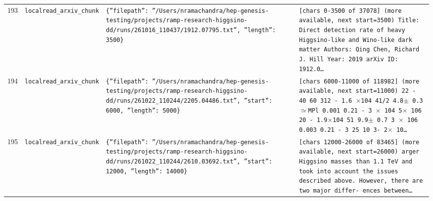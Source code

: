 \documentclass[11pt,a4paper]{article}
\begin{document}
\begin{longtable}{@{}p{}p{}p{}p{}@{}}
193 & \texttt{local}\newline\texttt{read\_\allowbreak{}arxiv\_\allowbreak{}chunk} & \texttt{\{''filepath'':\allowbreak{} ''/\allowbreak{}Users/\allowbreak{}nramachandra/\allowbreak{}hep-genesis-testing/\allowbreak{}projects/\allowbreak{}ramp-research-higgsino-dd/\allowbreak{}runs/\allowbreak{}261016\_\allowbreak{}110437/\allowbreak{}1912.07795.txt'',\allowbreak{} ''length'':\allowbreak{} 3500\}\allowbreak{}} & \texttt{[chars 0-3500 of 37078]\allowbreak{} (more available,\allowbreak{} next start=\allowbreak{}3500)\allowbreak{}  Title:\allowbreak{} Direct detection rate of heavy Higgsino-like and Wino-like dark matter Authors:\allowbreak{} Qing Chen,\allowbreak{} Richard J. Hill Year:\allowbreak{} 2019 arXiv ID:\allowbreak{} 1912.0\ldots{}\allowbreak{}} \\
194 & \texttt{local}\newline\texttt{read\_\allowbreak{}arxiv\_\allowbreak{}chunk} & \texttt{\{''filepath'':\allowbreak{} ''/\allowbreak{}Users/\allowbreak{}nramachandra/\allowbreak{}hep-genesis-testing/\allowbreak{}projects/\allowbreak{}ramp-research-higgsino-dd/\allowbreak{}runs/\allowbreak{}261022\_\allowbreak{}110244/\allowbreak{}2205.04486.txt'',\allowbreak{} ''start'':\allowbreak{} 6000,\allowbreak{} ''length'':\allowbreak{} 5000\}\allowbreak{}} & \texttt{[chars 6000-11000 of 118982]\allowbreak{} (more available,\allowbreak{} next start=\allowbreak{}11000)\allowbreak{}  22 - 40 60 312 - 1.6 $\times$104 41/\allowbreak{}2 4.8$\pm$ 0.3 $\simeq$MPl 0.001 0.21 - 3 $\times$ 104 5$\times$ 106 20 - 1.9$\times$104 51 9.9$\pm$ 0.7 3 $\times$ 106 0.003 0.21 - 3 25 10 3- 2$\times$ 10\ldots{}\allowbreak{}} \\
195 & \texttt{local}\newline\texttt{read\_\allowbreak{}arxiv\_\allowbreak{}chunk} & \texttt{\{''filepath'':\allowbreak{} ''/\allowbreak{}Users/\allowbreak{}nramachandra/\allowbreak{}hep-genesis-testing/\allowbreak{}projects/\allowbreak{}ramp-research-higgsino-dd/\allowbreak{}runs/\allowbreak{}261022\_\allowbreak{}110244/\allowbreak{}2610.03692.txt'',\allowbreak{} ''start'':\allowbreak{} 12000,\allowbreak{} ''length'':\allowbreak{} 14000\}\allowbreak{}} & \texttt{[chars 12000-26000 of 83465]\allowbreak{} (more available,\allowbreak{} next start=\allowbreak{}26000)\allowbreak{}  arger Higgsino masses than 1.1 TeV and took into account the issues described above. However,\allowbreak{} there are two major differ- ences between\ldots{}\allowbreak{}} \\

\end{longtable}
\end{document}
